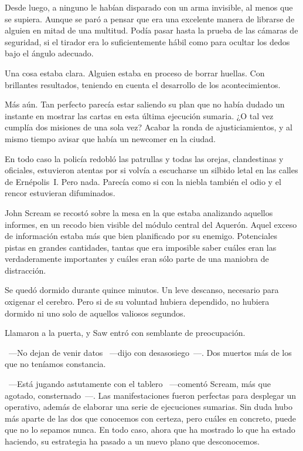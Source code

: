 Desde luego, a ninguno le habían disparado con un arma invisible, al menos que se supiera. Aunque se paró a pensar que era una excelente manera de librarse de alguien en mitad de una multitud. Podía pasar hasta la prueba de las cámaras de seguridad, si el tirador era lo suficientemente hábil como para ocultar los dedos bajo el ángulo adecuado.

Una cosa estaba clara. Alguien estaba en proceso de borrar huellas. Con brillantes resultados, teniendo en cuenta el desarrollo de los acontecimientos.

Más aún. Tan perfecto parecía estar saliendo su plan que no había dudado un instante en mostrar las cartas en esta última ejecución sumaria. ¿O tal vez cumplía dos misiones de una sola vez? Acabar la ronda de ajusticiamientos, y al mismo tiempo avisar que había un newcomer en la ciudad.

En todo caso la policía redobló las patrullas y todas las orejas, clandestinas y oficiales, estuvieron atentas por si volvía a escucharse un silbido letal en las calles de Ernépolis~I. Pero nada. Parecía como si con la niebla también el odio y el rencor estuvieran difuminados.

John Scream se recostó sobre la mesa en la que estaba analizando aquellos informes, en un recodo bien visible del módulo central del Aquerón. Aquel exceso de información estaba más que bien planificado por su enemigo. Potenciales pistas en grandes cantidades, tantas que era imposible saber cuáles eran las verdaderamente importantes y cuáles eran sólo parte de una maniobra de distracción.

Se quedó dormido durante quince minutos. Un leve descanso, necesario para oxigenar el cerebro. Pero si de su voluntad hubiera dependido, no hubiera dormido ni uno solo de aquellos valiosos segundos.

Llamaron a la puerta, y Saw entró con semblante de preocupación.

~---No dejan de venir datos ~---dijo con desasosiego~---. Dos muertos más de los que no teníamos constancia.

~---Está jugando astutamente con el tablero ~---comentó Scream, más que agotado, consternado~---. Las manifestaciones fueron perfectas para desplegar un operativo, además de elaborar una serie de ejecuciones sumarias. Sin duda hubo más aparte de las dos que conocemos con certeza, pero cuáles en concreto, puede que no lo sepamos nunca. En todo caso, ahora que ha mostrado lo que ha estado haciendo, su estrategia ha pasado a un nuevo plano que desconocemos.

